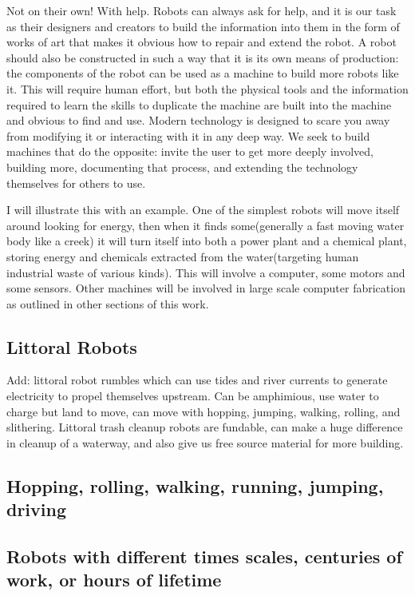 Not on their own! With help. Robots can always ask for help, and it is
our task as their designers and creators to build the information into
them in the form of works of art that makes it obvious how to repair and
extend the robot. A robot should also be constructed in such a way that
it is its own means of production: the components of the robot can be
used as a machine to build more robots like it. This will require human
effort, but both the physical tools and the information required to
learn the skills to duplicate the machine are built into the machine and
obvious to find and use. Modern technology is designed to scare you away
from modifying it or interacting with it in any deep way. We seek to
build machines that do the opposite: invite the user to get more deeply
involved, building more, documenting that process, and extending the
technology themselves for others to use.

I will illustrate this with an example. One of the simplest robots will
move itself around looking for energy, then when it finds some(generally
a fast moving water body like a creek) it will turn itself into both a
power plant and a chemical plant, storing energy and chemicals extracted
from the water(targeting human industrial waste of various kinds). This
will involve a computer, some motors and some sensors. Other machines
will be involved in large scale computer fabrication as outlined in
other sections of this work.

\subsection{Littoral Robots}\label{littoral-robots}

Add: littoral robot rumbles which can use tides and river currents to
generate electricity to propel themselves upstream. Can be amphimious,
use water to charge but land to move, can move with hopping, jumping,
walking, rolling, and slithering. Littoral trash cleanup robots are
fundable, can make a huge difference in cleanup of a waterway, and also
give us free source material for more building.

\subsection{Hopping, rolling, walking, running, jumping,
driving}\label{hopping-rolling-walking-running-jumping-driving}

\subsection{Robots with different times scales, centuries of work, or
hours of
lifetime}\label{robots-with-different-times-scales-centuries-of-work-or-hours-of-lifetime}

